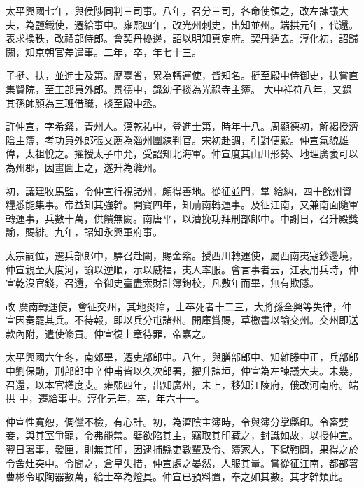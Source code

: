 \begin{pinyinscope}
 太平興國七年，與侯陟同判三司事。八年，召分三司，各命使領之，改左諫議大夫，為鹽鐵使，遷給事中。雍熙四年，改光州刺史，出知並州。端拱元年，代還。表求換秩，改禮部侍郎。會契丹擾邊，詔以明知真定府。契丹遁去。淳化初，詔歸闕，知京朝官差遣事。二年，卒，年七十三。



 子挺、扶，並進士及第。歷臺省，累為轉運使，皆知名。挺至殿中侍御史，扶嘗直集賢院，至工部員外郎。景德中，錄幼子掞為光祿寺主簿。
 大中祥符八年，又錄其孫師顏為三班借職，掞至殿中丞。



 許仲宣，字希粲，青州人。漢乾祐中，登進士第，時年十八。周顯德初，解褐授濟陰主簿，考功員外郎張乂薦為淄州團練判官。宋初赴調，引對便殿。仲宣氣貌雄偉，太祖悅之。擢授太子中允，受詔知北海軍。仲宣度其山川形勢、地理廣袤可以為州郡，因畫圖上之，遂升為濰州。



 初，議建牧馬監，令仲宣行視諸州，頗得善地。從征並門，掌
 給納，四十餘州資糧悉能集事。帝益知其強幹。開寶四年，知荊南轉運事。及征江南，又兼南面隨軍轉運事，兵數十萬，供饋無闕。南唐平，以漕挽功拜刑部郎中。中謝日，召升殿獎諭，賜緋。九年，詔知永興軍府事。



 太宗嗣位，遷兵部郎中，驛召赴闕，賜金紫。授西川轉運使，屬西南夷寇鈔邊境，仲宣親至大度河，諭以逆順，示以威福，夷人率服。會言事者云，江表用兵時，仲宣乾沒官錢，召還，令御史臺盡索財計簿鉤校，凡數年而畢，無有欺隱。



 改
 廣南轉運使，會征交州，其地炎瘴，士卒死者十二三，大將孫全興等失律，仲宣因奏罷其兵。不待報，即以兵分屯諸州。開庫賞賜，草檄書以諭交州。交州即送款內附，遣使修貢。仲宣復上章待罪，帝嘉之。



 太平興國六年冬，南郊畢，遷吏部郎中。八年，與膳部郎中、知雜滕中正，兵部郎中劉保勛，刑部郎中辛仲甫皆以久次郎署，擢升諫垣，仲宣為左諫議大夫。未幾，召還，以本官權度支。雍熙四年，出知廣州，未上，移知江陵府，俄改河南府。端拱
 中，遷給事中。淳化元年，卒，年六十一。



 仲宣性寬恕，倜儻不檢，有心計。初，為濟陰主簿時，令與簿分掌縣印。令畜嬖妾，與其室爭寵，令弗能禁。嬖欲陷其主，竊取其印藏之，封識如故，以授仲宣。翌日署事，發匣，則無其印，因逮捕縣吏數輩及令、簿家人，下獄鞫問，果得之於令舍灶突中。令聞之，倉皇失措，仲宣處之晏然，人服其量。嘗從征江南，都部署曹彬令取陶器數萬，給士卒為燈具。仲宣已預料置，奉之如其數。其才幹類此。




\end{pinyinscope}
